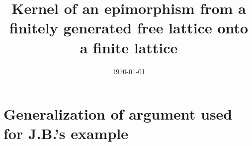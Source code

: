   \theoremstyle{plain}
  \newtheorem{theorem}{Theorem}[section]
  \newtheorem{lemma}[theorem]{Lemma}
  \newtheorem{proposition}[theorem]{Proposition}
  \newtheorem{prop}[theorem]{Prop.}
  \theoremstyle{definition}
  \newtheorem{conjecture}{Conjecture}
  \newtheorem{claim}[theorem]{Claim}
  \newtheorem{subclaim}{Subclaim}
  \newtheorem{corollary}[theorem]{Corollary}
  \newtheorem{definition}[theorem]{Definition}
  \newtheorem{notation}[theorem]{Notation}
  \newtheorem{Fact}[theorem]{Fact}
  \newtheorem*{fact}{Fact}
  \newtheorem{example}[theorem]{Example}
  \newtheorem{examples}[theorem]{Examples}
  \newtheorem{exercise}{Exercise}
  \newtheorem*{lem}{Lemma}
  \newtheorem*{cor}{Corollary}
  \newtheorem*{remark}{Remark}
  \newtheorem*{remarks}{Remarks}
  \newtheorem*{obs}{Observation}
  
  \title[Kernel of $\alg F(X) \onto \alg L$]{Kernel of an epimorphism from a finitely generated free lattice 
  onto a finite lattice}
  
  
  
  
  \date{\today}
  
  
  
  \maketitle
  
  \section{Generalization of argument used for J.B.'s example}

